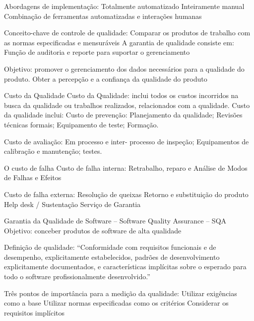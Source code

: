 \documentclass[12pt]{article}
\begin{document}
        Abordagens de implementação: 
            Totalmente automatizado 
            Inteiramente manual 
            Combinação de ferramentas automatizadas e interações humanas 

        Conceito-chave de controle de qualidade: Comparar os produtos de trabalho com as normas especificadas e mensuráveis 
        A garantia de qualidade consiste em: Função de auditoria e reporte para suportar o gerenciamento 
        
        Objetivo: 
            promover o gerenciamento dos dados necessários para a qualidade do produto. 
            Obter a percepção e a confiança da qualidade do produto
            
        Custo da Qualidade 
            Custo da Qualidade: inclui todos os custos incorridos na busca da qualidade ou trabalhos realizados, relacionados com a qualidade. 
            Custo da qualidade inclui: 
            Custo de prevenção: 
                Planejamento da qualidade;
                Revisões técnicas formais;
                Equipamento de teste; 
                Formação.

            Custo de avaliação: 
                Em processo e inter- processo de inspeção; 
                Equipamentos de calibração e manutenção; 
                testes.
                
            O custo de falha
            Custo de falha interna: 
                Retrabalho, reparo e Análise de Modos de Falhas e Efeitos
            
            Custo de falha externa: 
                Resolução de queixas 
                Retorno e substituição do produto 
                Help desk / Sustentação 
                Serviço de Garantia 

        Garantia da Qualidade de Software – Software Quality Assurance – SQA 
        Objetivo: conceber produtos de software de alta qualidade 

        Definição de qualidade: “Conformidade com requisitos funcionais e de desempenho, explicitamente estabelecidos, padrões de desenvolvimento explicitamente documentados, e características implícitas sobre o esperado para todo o software profissionalmente desenvolvido.” 

        Três pontos de importância para a medição da qualidade: 
            Utilizar exigências como a base 
            Utilizar normas especificadas como os critérios 
            Considerar os requisitos implícitos 
\end{document}

